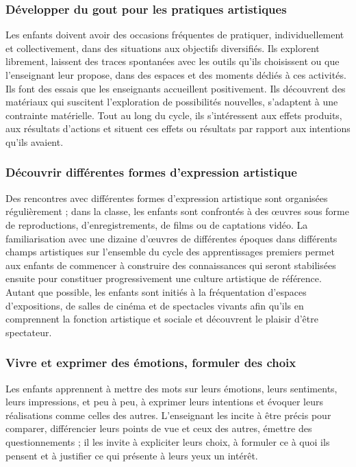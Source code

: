 \subsubsection{Développer du gout pour les pratiques artistiques}
Les enfants doivent avoir des occasions fréquentes de pratiquer, individuellement et collectivement, dans des situations aux objectifs diversifiés. Ils explorent librement, laissent des traces spontanées avec les outils qu’ils choisissent ou que l’enseignant leur propose, dans des espaces et des moments dédiés à ces activités. Ils font des essais que les enseignants accueillent positivement. Ils découvrent des matériaux qui suscitent l’exploration de possibilités nouvelles, s’adaptent à une contrainte matérielle. Tout au long du cycle, ils s’intéressent aux effets produits, aux résultats d’actions et situent ces effets ou résultats par rapport aux intentions qu’ils avaient.  

\subsubsection{Découvrir différentes formes d’expression artistique}
Des rencontres avec différentes formes d’expression artistique sont organisées régulièrement ; dans la classe, les enfants sont confrontés à des œuvres sous forme de reproductions, d'enregistrements, de films ou de captations vidéo. La familiarisation avec une dizaine d'œuvres de différentes époques dans différents champs artistiques sur l’ensemble du cycle des apprentissages premiers permet aux enfants de commencer à construire des connaissances qui seront stabilisées ensuite pour constituer progressivement une culture artistique de référence. Autant que possible, les enfants sont initiés à la fréquentation d'espaces d'expositions, de salles de cinéma et de spectacles vivants afin qu'ils en comprennent la fonction artistique et sociale et découvrent le plaisir d'être spectateur. 

\subsubsection{Vivre et exprimer des émotions, formuler des choix}
Les enfants apprennent à mettre des mots sur leurs émotions, leurs sentiments, leurs impressions, et peu à peu, à exprimer leurs intentions et évoquer leurs réalisations comme celles des autres. L’enseignant les incite à être précis pour comparer, différencier leurs points de vue et ceux des autres, émettre des questionnements ; il les invite à expliciter leurs choix, à formuler ce à quoi ils pensent et à justifier ce qui présente à leurs yeux un intérêt.


